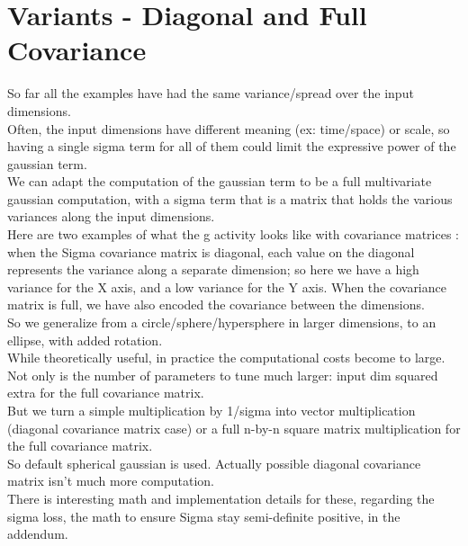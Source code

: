 \documentclass{article}
\begin{document}
\section{Variants - Diagonal and Full Covariance}
So far all the examples have had the same variance/spread over the input dimensions. \\
Often, the input dimensions have different meaning (ex: time/space) or scale, so having a single sigma term for all of them could limit the expressive power of the gaussian term.\\
We can adapt the computation of the gaussian term to be a full multivariate gaussian computation, with a sigma term that is a matrix that holds the various variances along the input dimensions.\\
Here are two examples of what the g activity looks like with covariance matrices : when the Sigma covariance matrix is diagonal, each value on the diagonal represents the variance along a separate dimension; so here we have a high variance for the X axis, and a low variance for the Y axis. When the covariance matrix is full, we have also encoded the covariance between the dimensions.\\
So we generalize from a circle/sphere/hypersphere in larger dimensions, to an ellipse, with added rotation.\\
While theoretically useful, in practice the computational costs become to large.\\
Not only is the number of parameters to tune much larger: input dim squared extra for the full covariance matrix.\\
But we turn a simple multiplication by 1/sigma into vector multiplication (diagonal covariance matrix case) or a full n-by-n square matrix multiplication for the full covariance matrix.\\
So default spherical gaussian is  used. Actually possible diagonal covariance matrix isn't much more computation.\\
There is interesting math and implementation details for these, regarding the sigma loss, the math to ensure Sigma stay semi-definite positive, in the addendum. 
\end{document}
